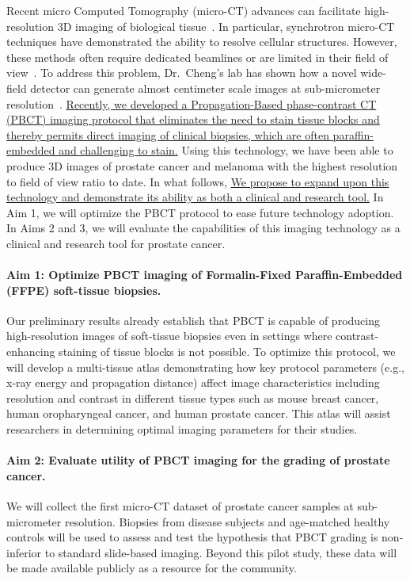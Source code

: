 \documentclass{NIHGrant}
\theoremstyle{theorem}
\begin{document}
Recent micro Computed Tomography (micro-CT) advances can facilitate high-resolution 3D imaging of biological tissue~\cite{albers_x-ray-based_2018,katsamenis_x-ray_2019}. In particular, synchrotron micro-CT techniques have demonstrated the ability to resolve cellular structures. However, these methods often require dedicated beamlines or are limited in their field of view~\cite{topperwien_contrast_2019,pinkert-leetsch_three-dimensional_2023,frost_3d_2023}. To address this problem, Dr.~Cheng's lab has shown how a novel wide-field detector can generate almost centimeter scale images at sub-micrometer resolution~\cite{yakovlev_wide-field_2022}. \uline{Recently, we developed a Propagation-Based phase-contrast CT (PBCT) imaging protocol that eliminates the need to stain tissue blocks and thereby permits direct imaging of clinical biopsies, which are often paraffin-embedded and challenging to stain.} Using this technology, we have been able to produce 3D images of prostate cancer and melanoma with the highest resolution to field of view ratio to date. In what follows, \uline{We propose to expand upon this technology and demonstrate its ability as both a clinical and research tool.} In Aim 1, we will optimize the PBCT protocol to ease future technology adoption. In Aims 2 and 3, we will evaluate the capabilities of this imaging technology as a clinical and research tool for prostate cancer.

\noindent
\paragraph*{Aim 1: Optimize PBCT imaging of Formalin-Fixed Paraffin-Embedded (FFPE) soft-tissue biopsies.}
Our preliminary results already establish that PBCT is capable of producing high-resolution images of soft-tissue biopsies even in settings where contrast-enhancing staining of tissue blocks is not possible. To optimize this protocol, we will develop a multi-tissue atlas demonstrating how key protocol parameters (e.g., x-ray energy and propagation distance) affect image characteristics including resolution and contrast in different tissue types such as mouse breast cancer, human oropharyngeal cancer, and human prostate cancer. This atlas will assist researchers in determining optimal imaging parameters for their studies.

\paragraph*{Aim 2: Evaluate utility of PBCT imaging for the grading of prostate cancer.}
We will collect the first micro-CT dataset of prostate cancer samples at sub-micrometer resolution. Biopsies from disease subjects and age-matched healthy controls will be used to assess and test the hypothesis that PBCT grading is non-inferior to standard slide-based imaging. Beyond this pilot study, these data will be made available publicly as a resource for the community.
\end{document}
